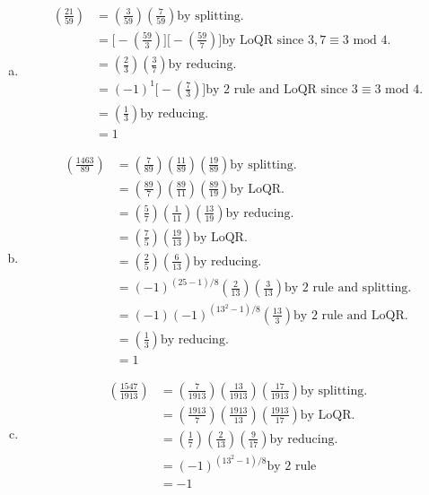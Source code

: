 \documentclass[class=article, crop=false]{standalone}
\def\leg#1#2{\left(\frac{#1}{#2}\right)}
\begin{document}
\subsubsection{}
\begin{enumerate}[(a)]
  \item
    \begin{align*}
      \leg{21}{59} &= \leg{3}{59}\leg{7}{59} \text{by splitting.} \\
      &= \Big[-\leg{59}{3}\Big] \Big[-\leg{59}{7}\Big] \text{by LoQR since }3,7\equiv 3\mbox{ mod }4. \\
      &= \leg{2}{3}\leg{3}{7} \text{by reducing.} \\
      &= (-1)^{1} \Big[-\leg{7}{3}\Big] \text{by 2 rule and LoQR since }3\equiv 3\mbox{ mod }4. \\
      &= \leg{1}{3} \text{by reducing.} \\
      &= 1
    \end{align*}
  \item
    \begin{align*}
      \leg{1463}{89} &= \leg{7}{89}\leg{11}{89}\leg{19}{89} \text{by splitting.}\\
      &= \leg{89}{7}\leg{89}{11}\leg{89}{19} \text{by LoQR.} \\
      &= \leg{5}{7}\leg{1}{11}\leg{13}{19} \text{by reducing.} \\
      &= \leg{7}{5}\leg{19}{13} \text{by LoQR.} \\
      &= \leg{2}{5}\leg{6}{13} \text{by reducing.} \\
      &= (-1)^{(25-1)/8}\leg{2}{13}\leg{3}{13} \text{by 2 rule and splitting.} \\
      &= (-1)(-1)^{(13^2-1)/8} \leg{13}{3} \text{by 2 rule and LoQR.} \\
      &= \leg{1}{3} \text{by reducing.} \\
      &= 1
    \end{align*}
  \item
    \begin{align*}
      \leg{1547}{1913} &= \leg{7}{1913}\leg{13}{1913}\leg{17}{1913} \text{by splitting.} \\
      &= \leg{1913}{7}\leg{1913}{13}\leg{1913}{17} \text{by LoQR.} \\
      &= \leg{1}{7}\leg{2}{13}\leg{9}{17} \text{by reducing.} \\
      &= (-1)^{(13^2-1)/8} \text{by 2 rule} \\
      &= -1
    \end{align*}
  \end{enumerate}
\end{document}
